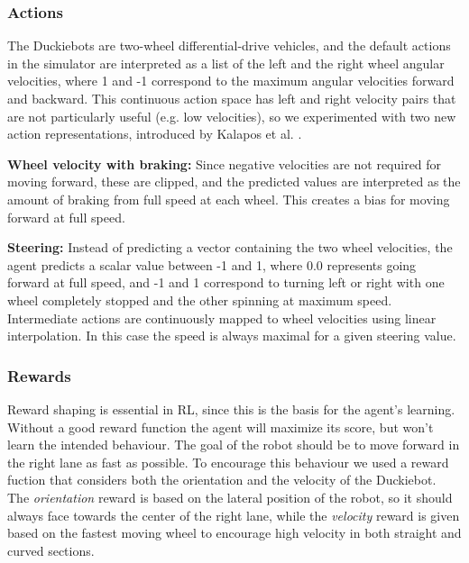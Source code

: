\documentclass{article}
\begin{document}
\subsubsection{\normalsize{Actions}}
\label{sec:actions}
The Duckiebots are two-wheel differential-drive vehicles, and the default actions in the simulator are interpreted as a list of the left and the right wheel angular velocities, where 1 and -1 correspond to the maximum angular velocities forward and backward. This continuous action space has left and right velocity pairs that are not particularly useful (e.g. low velocities), so we experimented with two new action representations, introduced by Kalapos et al. \cite{kalap}.

\textbf{Wheel velocity with braking:} Since negative velocities are not required for moving forward, these are clipped, and the predicted values are interpreted as the amount of braking from full speed at each wheel. This creates a bias for moving forward at full speed.

\textbf{Steering:} Instead of predicting a vector containing the two wheel velocities, the agent predicts a scalar value between -1 and 1, where 0.0 represents going forward at full speed, and -1 and 1 correspond to turning left or right with one wheel completely stopped and the other spinning at maximum speed. Intermediate actions are continuously mapped to wheel velocities using linear interpolation. In this case the speed is always maximal for a given steering value.

\subsubsection{\normalsize{Rewards}}
\label{sec:rewards}
Reward shaping is essential in RL, since this is the basis for the agent's learning. Without a good reward function the agent will maximize its score, but won't learn the intended behaviour. The goal of the robot should be to move forward in the right lane as fast as possible. To encourage this behaviour we used a reward fuction \cite{kalap} that considers both the orientation and the velocity of the Duckiebot. The \textit{orientation} reward is based on the lateral position of the robot, so it should always face towards the center of the right lane, while the \textit{velocity} reward is given based on the fastest moving wheel to encourage high velocity in both straight and curved sections.
\end{document}
